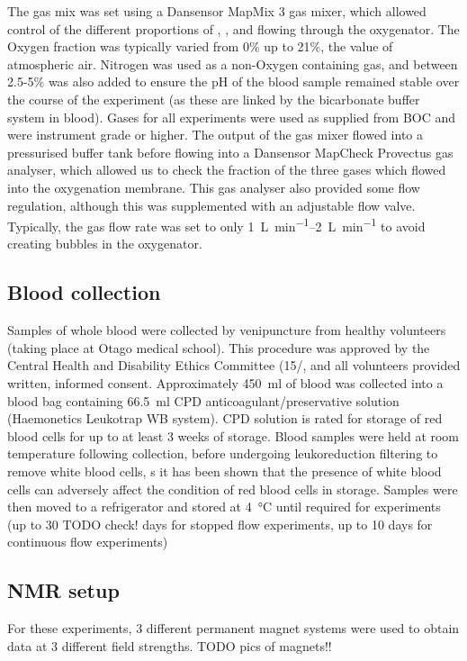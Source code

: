 The gas mix was set using a Dansensor MapMix 3 gas mixer, which allowed control of the different proportions of \Ntwo, \Otwo, and \COtwo flowing through the oxygenator.
The Oxygen fraction was typically varied from 0\% up to 21\%, the value of atmospheric air.
Nitrogen was used as a non-Oxygen containing gas, and between 2.5-5\% \COtwo was also added to ensure the pH of the blood sample remained stable over the course of the experiment (as these are linked by the bicarbonate buffer system in blood).
Gases for all experiments were used as supplied from BOC and were instrument grade or higher.
The output of the gas mixer flowed into a pressurised buffer tank before flowing into a Dansensor MapCheck Provectus gas analyser, which allowed us to check the fraction of the three gases which flowed into the oxygenation membrane.
This gas analyser also provided some flow regulation, although this was supplemented with an adjustable flow valve.
Typically, the gas flow rate was set to only \SIrange[per-mode=symbol]{1}{2}{\liter\per\minute} to avoid creating bubbles in the oxygenator.

\subsection{Blood collection}
Samples of whole blood were collected by venipuncture from healthy volunteers (taking place at Otago medical school).
This procedure was approved by the Central Health and Disability Ethics Committee (15/, and all volunteers provided written, informed consent.
Approximately \SI{450}{ml} of blood was collected into a blood bag containing \SI{66.5}{\milli\litre} CPD anticoagulant/preservative solution (Haemonetics Leukotrap WB system).
CPD solution is rated for storage of red blood cells for up to at least 3 weeks of storage\cite{Hessupdatesolutionsred2006}.
Blood samples were held at room temperature following collection, before undergoing leukoreduction filtering to remove white blood cells, s it has been shown that the presence of white blood cells can adversely affect the condition of red blood cells in storage\cite{Hessupdatesolutionsred2006}.
Samples were then moved to a refrigerator and stored at \SI{4}{\degreeCelsius} until required for experiments (up to 30 TODO check! days for stopped flow experiments, up to 10 days for continuous flow experiments)

\subsection{NMR setup}
For these experiments, 3 different permanent magnet systems were used to obtain data at 3 different field strengths.
TODO pics of magnets!!

